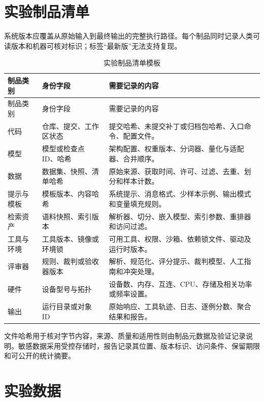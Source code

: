 \documentclass[../workbook.tex]{subfiles}
\begin{document}
\section{实验制品清单}

系统版本应覆盖从原始输入到最终输出的完整执行路径。每个制品同时记录人类可读版本和机器可核对标识；标签“最新版”无法支持复现。

\begin{longtable}{@{}p{.23\linewidth}p{.29\linewidth}p{.39\linewidth}@{}}
\caption{实验制品清单模板}\label{tab:appendix-artifact-manifest}\\
\toprule
制品类别 & 身份字段 & 需要记录的内容\\\midrule
\endfirsthead
\toprule
制品类别 & 身份字段 & 需要记录的内容\\\midrule
\endhead
代码 & 仓库、提交、工作区状态 & 提交哈希、未提交补丁或归档包哈希、入口命令、配置文件。\\
模型 & 模型或检查点 ID、哈希 & 架构配置、权重版本、分词器、量化与适配器、合并顺序。\\
数据 & 数据集、快照、清单哈希 & 原始来源、获取时间、许可、过滤、去重、划分和样本计数。\\
提示与模板 & 模板版本、内容哈希 & 系统提示、消息格式、少样本示例、输出模式和变量填充规则。\\
检索资产 & 语料快照、索引版本 & 解析器、切分、嵌入模型、索引参数、重排器和访问过滤。\\
工具与环境 & 工具版本、镜像或环境锁 & 可用工具、权限、沙箱、依赖锁文件、驱动及运行时版本。\\
评审器 & 规则、裁判或验收器版本 & 解析、规范化、评分提示、裁判模型、人工指南和冲突处理。\\
硬件 & 设备型号与拓扑 & 设备数、内存、互连、CPU、存储及相关功率或频率设置。\\
输出 & 运行目录或对象 ID & 原始响应、工具轨迹、日志、逐例分数、聚合结果和报告。\\
\bottomrule
\end{longtable}

文件哈希用于核对字节内容，来源、质量和适用性则由制品元数据及验证记录说明。敏感数据采用受控存储时，报告记录其位置、版本标识、访问条件、保留期限和可公开的统计摘要。

\section{实验数据}
\end{document}
